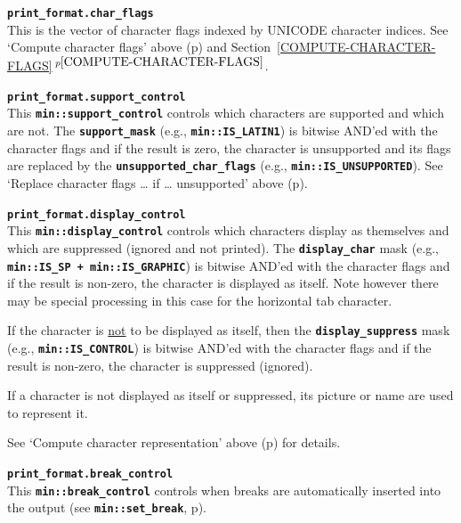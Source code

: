 \documentclass[12pt]{article}
\makeatletter
\newcommand{\TT}[1]{{\tt \bfseries #1}}
\newcommand{\ttmkey}[2]{\TT{#1}\index{#1@{\tt #1}!#2}}
\newcommand{\itemref}[1]{\ref{#1}$\,^{p\pageref{#1}}$}
\newcommand{\pagref}[1]{p\pageref{#1}}
\newcommand{\EOL}{\penalty \exhyphenpenalty}
\newenvironment{itemlist}[1][1.2in]%
	{\begin{list}{}{\setlength{\labelwidth}{#1}%
		        \setlength{\leftmargin}{\labelwidth}%
		        \addtolength{\leftmargin}{+0.2in}%
		        \renewcommand{\makelabel}[1]{##1\hfill}}}%
	{\end{list}}
\makeatother
\begin{document}
\begin{itemlist}[0.6in]

\item[\ttmkey{print\_format.char\_flags}{in {\tt min::printer}}]%
\label{PRINT_FORMAT_CHAR_FLAGS}~\\
This is the vector of character flags indexed by UNICODE character
indices.
See `Compute character flags' above
(\pagref{COMPUTE-CHARACTER-FLAGS})
and Section~\itemref{COMPUTE-CHARACTER-FLAGS}.

\item[\ttmkey{print\_format.support\_control}{in {\tt min::printer}}]%
\label{PRINT_FORMAT_SUPPORT_CONTROL}~\\
\label{SUPPORT-CONTROL}
This \TT{min::support\_control} controls which characters are supported
and which are not.  The \TT{support\_\EOL mask}
(e.g., \TT{min::\EOL IS\_\EOL LATIN1}) is bitwise AND'ed with
the character flags and if the result is zero, the character is unsupported
and its flags are replaced by the
\TT{unsupported\_\EOL char\_\EOL flags}
(e.g., \TT{min::\EOL IS\_\EOL UNSUPPORTED}).
See `Replace character flags \ldots{} if \ldots{} unsupported' above
(\pagref{REPLACE-CHARACTER-FLAGS}).

\item[\ttmkey{print\_format.display\_control}{in {\tt min::printer}}]%
\label{PRINT_FORMAT_DISPLAY_CONTROL}~\\
This \TT{min::display\_control} controls which characters display as
themselves and which are suppressed (ignored and not printed).
The \TT{display\_\EOL char} mask
(e.g., \TT{min::\EOL IS\_\EOL SP + min::\EOL IS\_\EOL GRAPHIC})
is bitwise AND'ed with
the character flags and if the result is non-zero,
the character is displayed as itself.  Note however there may
be special processing in this case for the horizontal tab character.

If the character is \underline{not} to be displayed as itself, then
the \TT{display\_\EOL suppress} mask
(e.g., \TT{min::\EOL IS\_\EOL CONTROL})
is bitwise AND'ed with
the character flags and if the result is non-zero,
the character is suppressed (ignored).

If a character is not displayed as itself or suppressed, its picture
or name are used to represent it.

See `Compute character representation' above
(\pagref{COMPUTE-PRINTED-REPRESENTATION}) for details.

\item[\ttmkey{print\_format.break\_control}{in {\tt min::printer}}]%
\label{PRINT_FORMAT_BREAK_CONTROL}~\\
This \TT{min::break\_control} controls when breaks are automatically
inserted into the output (see \TT{min::\EOL set\_\EOL break},
\pagref{MIN::SET_BREAK}).


\end{itemlist}
\end{document}
